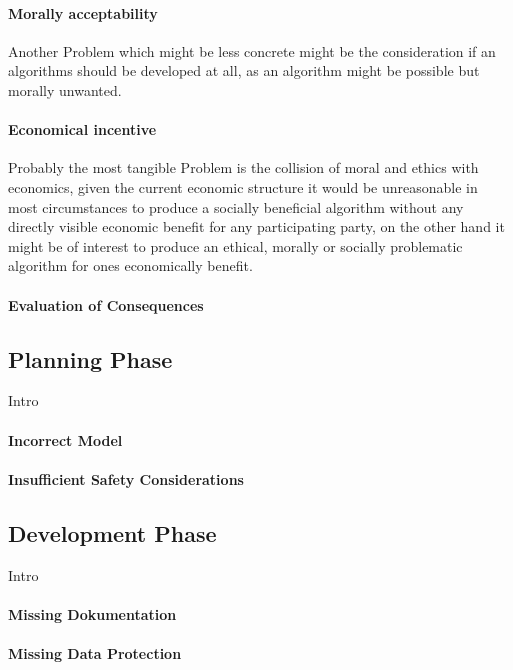 \documentclass[sigconf,nonacm,natbib=false]{acmart}
\begin{document}
\paragraph{Morally acceptability}
Another Problem which might be less concrete might be the consideration if an algorithms should be developed at all,
as an algorithm might be possible but morally unwanted.

\paragraph{Economical incentive}
Probably the most tangible Problem is the collision of moral and ethics with economics, given the current economic structure it would be unreasonable in most circumstances to produce a socially beneficial algorithm without any directly visible economic benefit for any participating party, on the other hand it might be of interest to produce an ethical, morally or socially problematic algorithm for ones economically benefit. 

\paragraph{Evaluation of Consequences}

\subsection{Planning Phase}
Intro

\paragraph{Incorrect Model}
\paragraph{Insufficient Safety Considerations}

\subsection{Development Phase}
Intro
\paragraph{Missing Dokumentation}

\paragraph{Missing Data Protection}
\end{document}
